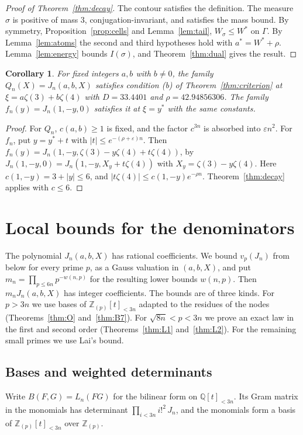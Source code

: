\documentclass[11pt]{amsart}
\newtheorem{corollary}[theorem]{Corollary}
\theoremstyle{definition}
\theoremstyle{remark}
\numberwithin{equation}{section}
\newcommand{\Z}{\mathbb Z}
\newcommand{\Q}{\mathbb Q}
\begin{document}
\begin{proof}[Proof of Theorem~\textup{\ref{thm:decay}}]
The contour satisfies the definition. The measure $\sigma$ is positive of mass $3$, conjugation-invariant, and satisfies
the mass bound. By symmetry, Proposition~\ref{prop:cells} and Lemma~\ref{lem:tail}, $W_\sigma\le W^*$ on $\Gamma$. By
Lemma~\ref{lem:atoms} the second and third hypotheses hold with $a^*=W^*+\rho$. Lemma~\ref{lem:energy} bounds
$I(\sigma)$, and Theorem~\ref{thm:dual} gives the result.
\end{proof}

\begin{corollary}\label{cor:families}
For fixed integers $a,b$ with $b\ne0$, the family $Q_n(X)=J_n(a,b,X)$ satisfies condition (b) of
Theorem~\ref{thm:criterion} at $\xi=a\zeta(3)+b\zeta(4)$ with $D=33.4401$ and $\rho=42.94856306$. The family
$f_n(y)=J_n(1,-y,0)$ satisfies it at $\xi=y^*$ with the same constants.
\end{corollary}

\begin{proof}
For $Q_n$, $c(a,b)\ge1$ is fixed, and the factor $c^{3n}$ is absorbed into $\varepsilon n^2$. For $f_n$, put
$y=y^*+t$ with $|t|\le e^{-(\rho+\varepsilon)n}$. Then $f_n(y)=J_n(1,-y,\zeta(3)-y\zeta(4)+t\zeta(4))$, by
$J_n(1,-y,0)=J_n(1,-y,X_y+t\zeta(4))$ with $X_y=\zeta(3)-y\zeta(4)$. Here $c(1,-y)=3+|y|\le6$, and
$|t\zeta(4)|\le c(1,-y)e^{-\rho n}$. Theorem~\ref{thm:decay} applies with $c\le6$.
\end{proof}

\section{Local bounds for the denominators}\label{sec:local}

The polynomial $J_n(a,b,X)$ has rational coefficients. We bound $v_p(J_n)$ from below for every prime $p$, as a
Gauss valuation in $(a,b,X)$, and put $m_n=\prod_{p\le6n}p^{-w(n,p)}$ for the resulting lower bounds $w(n,p)$.
Then $m_nJ_n(a,b,X)$ has integer coefficients. The bounds are of three kinds. For $p>3n$ we use bases of
$\Z_{(p)}[t]_{<3n}$ adapted to the residues of the nodes (Theorems~\ref{thm:O} and~\ref{thm:B7}). For
$\sqrt{8n}<p<3n$ we prove an exact law in the first and second order (Theorems~\ref{thm:L1} and~\ref{thm:L2}). For the
remaining small primes we use Lai's bound.

\subsection{Bases and weighted determinants}
Write $B(F,G)=L_n(FG)$ for the bilinear form on $\Q[t]_{<3n}$. Its Gram matrix in the monomials has determinant
$\prod_{i<3n}i!^2\,J_n$, and the monomials form a basis of $\Z_{(p)}[t]_{<3n}$ over $\Z_{(p)}$.
\end{document}
